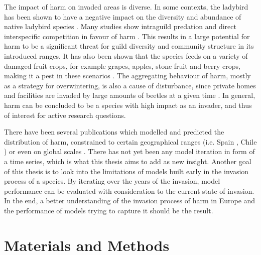 \documentclass[12pt,a4paper]{article}
\begin{document}
The impact of \gls{harm} on invaded areas is diverse.
In some contexts, the ladybird has been shown to have a negative impact on the diversity and abundance of native ladybird species \autocite{roy2016harmonia}.
Many studies show intraguild predation and direct interspecific competition in favour of \gls{harm} \autocite{pell2008harmoniaIGP}.
This results in a large potential for \gls{harm} to be a significant threat for guild diversity and community structure in its introduced ranges.
It has also been shown that the species feeds on a variety of damaged fruit crops, for example grapes, apples, stone fruit and berry crops, making it a pest in these scenarios \autocite{koch2004harmoniafoodcrop}.
The aggregating behaviour of \gls{harm}, mostly as a strategy for overwintering, is also a cause of disturbance, since private homes and facilities are invaded by large amounts of beetles at a given time \autocite{nalepa2005harmoniahomes}.
In general, \gls{harm} can be concluded to be a species with high impact as an invader, and thus of interest for active research questions.

There have been several publications which modelled and predicted the distribution of \gls{harm}, constrained to certain geographical ranges (i.e. Spain \autocite{ameixa2019harmSDMSpain}, Chile \autocite{alaniz2018harmSDMChile}) or even on global scales \autocite{bidinger2012harmSDMglobalMaxent, poutsma2008harmSDMglobalClimex}.
There has not yet been any model iteration in form of a time series, which is what this thesis aims to add as new insight.
Another goal of this thesis is to look into the limitations of models built early in the invasion process of a species.
By iterating over the years of the invasion, model performance can be evaluated with consideration to the current state of invasion.
In the end, a better understanding of the invasion process of \gls{harm} in Europe and the performance of models trying to capture it should be the result.



\newpage
\section{Materials and Methods} \label{sec:materialsandmethods}
\end{document}

